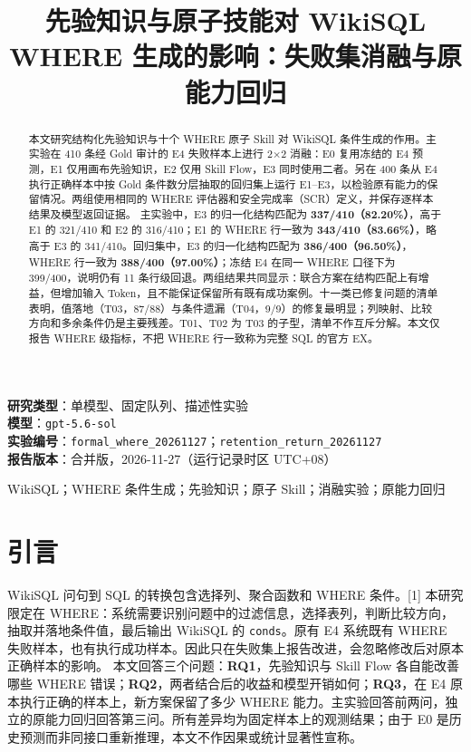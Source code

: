 \documentclass[conference]{IEEEtran}
\begin{document}
\title{先验知识与原子技能对 WikiSQL WHERE 生成的影响：失败集消融与原能力回归}
\author{}
\maketitle
\begin{center}\small
\textbf{研究类型}：单模型、固定队列、描述性实验\\
\textbf{模型}：\texttt{gpt-5.6-sol}\\
\textbf{实验编号}：\texttt{formal\_where\_20261127}；\texttt{retention\_return\_20261127}\\
\textbf{报告版本}：合并版，2026-11-27（运行记录时区 UTC+08）
\end{center}
\vspace{2mm}
\begin{abstract}
本文研究结构化先验知识与十个 WHERE 原子 Skill 对 WikiSQL 条件生成的作用。主实验在 410 条经 Gold 审计的 E4 失败样本上进行 2×2 消融：E0 复用冻结的 E4 预测，E1 仅用画布先验知识，E2 仅用 Skill Flow，E3 同时使用二者。另在 400 条从 E4 执行正确样本中按 Gold 条件数分层抽取的回归集上运行 E1–E3，以检验原有能力的保留情况。两组使用相同的 WHERE 评估器和安全完成率（SCR）定义，并保存逐样本结果及模型返回证据。
主实验中，E3 的归一化结构匹配为 \textbf{337/410（82.20\%）}，高于 E1 的 321/410 和 E2 的 316/410；E1 的 WHERE 行一致为 \textbf{343/410（83.66\%）}，略高于 E3 的 341/410。回归集中，E3 的归一化结构匹配为 \textbf{386/400（96.50\%）}，WHERE 行一致为 \textbf{388/400（97.00\%）}；冻结 E4 在同一 WHERE 口径下为 399/400，说明仍有 11 条行级回退。两组结果共同显示：联合方案在结构匹配上有增益，但增加输入 Token，且不能保证保留所有既有成功案例。十一类已修复问题的清单表明，值落地（T03，87/88）与条件遗漏（T04，9/9）的修复最明显；列映射、比较方向和多余条件仍是主要残差。T01、T02 为 T03 的子型，清单不作互斥分解。本文仅报告 WHERE 级指标，不把 WHERE 行一致称为完整 SQL 的官方 EX。
\end{abstract}
\begin{IEEEkeywords}
WikiSQL；WHERE 条件生成；先验知识；原子 Skill；消融实验；原能力回归
\end{IEEEkeywords}
\section{引言}
WikiSQL 问句到 SQL 的转换包含选择列、聚合函数和 WHERE 条件。[1] 本研究限定在 WHERE：系统需要识别问题中的过滤信息，选择表列，判断比较方向，抽取并落地条件值，最后输出 WikiSQL 的 \texttt{conds}。原有 E4 系统既有 WHERE 失败样本，也有执行成功样本。因此只在失败集上报告改进，会忽略修改后对原本正确样本的影响。
本文回答三个问题：\textbf{RQ1}，先验知识与 Skill Flow 各自能改善哪些 WHERE 错误；\textbf{RQ2}，两者结合后的收益和模型开销如何；\textbf{RQ3}，在 E4 原本执行正确的样本上，新方案保留了多少 WHERE 能力。主实验回答前两问，独立的原能力回归回答第三问。所有差异均为固定样本上的观测结果；由于 E0 是历史预测而非同接口重新推理，本文不作因果或统计显著性宣称。
\end{document}
